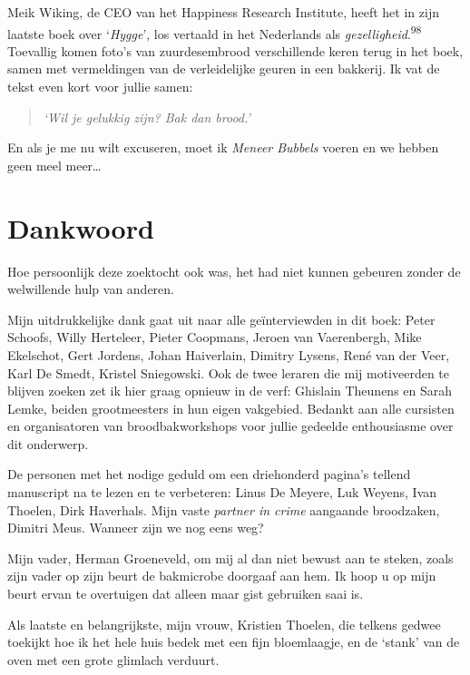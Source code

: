 \documentclass[
  11pt,
  dutch,
]{memoir}
\begin{document}
Meik Wiking, de CEO van het Happiness Research Institute, heeft het in
zijn laatste boek over `\emph{Hygge}', los vertaald in het Nederlands
als \emph{gezelligheid}.\textsuperscript{98} Toevallig komen foto's van
zuurdesembrood verschillende keren terug in het boek, samen met
vermeldingen van de verleidelijke geuren in een bakkerij. Ik vat de
tekst even kort voor jullie samen:

\begin{quote}
\emph{`Wil je gelukkig zijn? Bak dan brood.'}
\end{quote}

En als je me nu wilt excuseren, moet ik \emph{Meneer Bubbels} voeren en
we hebben geen meel meer\ldots{}

\hypertarget{dankwoord}{%
\chapter{Dankwoord}\label{dankwoord}}

Hoe persoonlijk deze zoektocht ook was, het had niet kunnen gebeuren
zonder de welwillende hulp van anderen.

Mijn uitdrukkelijke dank gaat uit naar alle geïnterviewden in dit boek:
Peter Schoofs, Willy Herteleer, Pieter \mbox{Coopmans}, Jeroen van
Vaerenbergh, Mike Ekelschot, Gert Jordens, Johan Haiverlain, Dimitry
Lysens, René van der Veer, Karl De Smedt, Kristel Sniegowski. Ook de
twee leraren die mij motiveerden te blijven zoeken zet ik hier graag
opnieuw in de verf: Ghislain Theunens en Sarah Lemke, beiden
grootmeesters in hun eigen vakgebied. Bedankt aan alle cursisten en
organisatoren van broodbakworkshops voor jullie gedeelde enthousiasme
over dit onderwerp.

De personen met het nodige geduld om een driehonderd pagina's tellend
manuscript na te lezen en te verbeteren: \mbox{Linus} De Meyere, Luk
Weyens, Ivan Thoelen, Dirk Haverhals. Mijn vaste \emph{partner in crime}
aangaande broodzaken, Dimitri Meus. Wanneer zijn we nog eens weg?

Mijn vader, Herman Groeneveld, om mij al dan niet bewust aan te steken,
zoals zijn vader op zijn beurt de bakmicrobe doorgaaf aan hem. Ik hoop u
op mijn beurt ervan te overtuigen dat alleen maar gist gebruiken saai
is.

Als laatste en belangrijkste, mijn vrouw, Kristien \mbox{Thoelen}, die
telkens gedwee toekijkt hoe ik het hele huis bedek met een fijn
bloemlaagje, en de `stank' van de oven met een grote glimlach verduurt.
\end{document}
